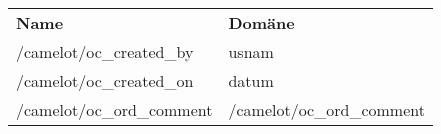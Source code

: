 \begin{tabu}{p{0.5\textwidth}p{0.46\textwidth }}
\rowfont{\bfseries\leavevmode\color{headingfont}}\textbf{Name} & \textbf{Domäne} \\
/camelot/oc\_created\_by & usnam \\
/camelot/oc\_created\_on & datum \\
/camelot/oc\_ord\_comment & /camelot/oc\_ord\_comment \\
\end{tabu}